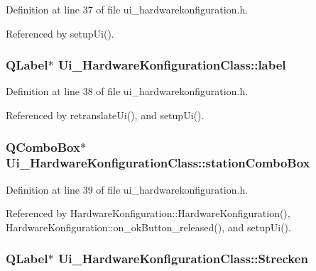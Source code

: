 Definition at line 37 of file ui\_\-hardwarekonfiguration.h.

Referenced by setupUi().\hypertarget{class_ui___hardware_konfiguration_class_03ccc259e2085a6124a83518674a5a6a}{
\subsubsection[label]{\setlength{\rightskip}{0pt plus 5cm}QLabel$\ast$ {\bf Ui\_\-HardwareKonfigurationClass::label}}}
\label{class_ui___hardware_konfiguration_class_03ccc259e2085a6124a83518674a5a6a}




Definition at line 38 of file ui\_\-hardwarekonfiguration.h.

Referenced by retranslateUi(), and setupUi().\hypertarget{class_ui___hardware_konfiguration_class_167dcb3e915d3baa57057e640ad0436e}{
\subsubsection[stationComboBox]{\setlength{\rightskip}{0pt plus 5cm}QComboBox$\ast$ {\bf Ui\_\-HardwareKonfigurationClass::stationComboBox}}}
\label{class_ui___hardware_konfiguration_class_167dcb3e915d3baa57057e640ad0436e}




Definition at line 39 of file ui\_\-hardwarekonfiguration.h.

Referenced by HardwareKonfiguration::HardwareKonfiguration(), HardwareKonfiguration::on\_\-okButton\_\-released(), and setupUi().\hypertarget{class_ui___hardware_konfiguration_class_7d350559025b3702ce89ec8d4f69baec}{
\subsubsection[Strecken]{\setlength{\rightskip}{0pt plus 5cm}QLabel$\ast$ {\bf Ui\_\-HardwareKonfigurationClass::Strecken}}}
\label{class_ui___hardware_konfiguration_class_7d350559025b3702ce89ec8d4f69baec}




